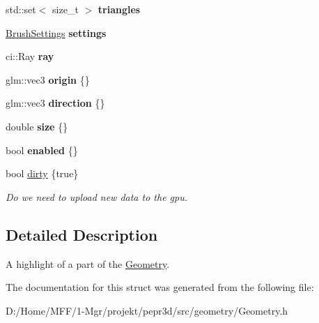 \begin{DoxyCompactItemize}
\item 
\mbox{\label{structpepr3d_1_1_geometry_1_1_area_highlight_a39bafbb704eed4caf358ea9778fb64a9}} 
std\+::set$<$ size\+\_\+t $>$ {\bfseries triangles}
\item 
\mbox{\label{structpepr3d_1_1_geometry_1_1_area_highlight_a539a565869566b643d3536c2b9e3998f}} 
\mbox{\hyperlink{structpepr3d_1_1_brush_settings}{Brush\+Settings}} {\bfseries settings}
\item 
\mbox{\label{structpepr3d_1_1_geometry_1_1_area_highlight_ad39e62ccee10d0fb4c8165627aa952ec}} 
ci\+::\+Ray {\bfseries ray}
\item 
\mbox{\label{structpepr3d_1_1_geometry_1_1_area_highlight_a33cf93e0ff8d167b0a4b877740dee49d}} 
glm\+::vec3 {\bfseries origin} \{\}
\item 
\mbox{\label{structpepr3d_1_1_geometry_1_1_area_highlight_a7538655d67f5bfb2a04117f6fa6d3f51}} 
glm\+::vec3 {\bfseries direction} \{\}
\item 
\mbox{\label{structpepr3d_1_1_geometry_1_1_area_highlight_a980ab51ea5dac86ef2fb68dbf6dc079f}} 
double {\bfseries size} \{\}
\item 
\mbox{\label{structpepr3d_1_1_geometry_1_1_area_highlight_a054fa63a3e60e4a1e3b8db7a22aebf6f}} 
bool {\bfseries enabled} \{\}
\item 
\mbox{\label{structpepr3d_1_1_geometry_1_1_area_highlight_a129df0b43636f676500fdf0beb3cd021}} 
bool \mbox{\hyperlink{structpepr3d_1_1_geometry_1_1_area_highlight_a129df0b43636f676500fdf0beb3cd021}{dirty}} \{true\}
\begin{DoxyCompactList}\small\item\em Do we need to upload new data to the gpu. \end{DoxyCompactList}\end{DoxyCompactItemize}


\subsection{Detailed Description}
A highlight of a part of the \mbox{\hyperlink{classpepr3d_1_1_geometry}{Geometry}}. 

The documentation for this struct was generated from the following file\+:\begin{DoxyCompactItemize}
\item 
D\+:/\+Home/\+M\+F\+F/1-\/\+Mgr/projekt/pepr3d/src/geometry/Geometry.\+h\end{DoxyCompactItemize}
